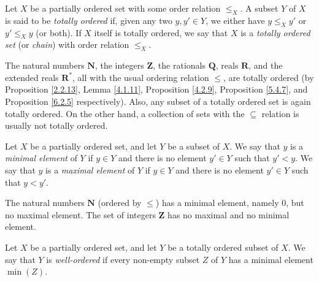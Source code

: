 \begin{definition}\label{8.5.3}
    Let \(X\) be a partially ordered set with some order relation \(\leq_X\).
    A subset \(Y\) of \(X\) is said to be \emph{totally ordered} if, given any two \(y, y' \in Y\), we either have \(y \leq_X y'\) or \(y' \leq_X y\) (or both).
    If \(X\) itself is totally ordered, we say that \(X\) is a \emph{totally ordered set} (or \emph{chain}) with order relation \(\leq_X\).
\end{definition}

\begin{example}\label{8.5.4}
    The natural numbers \(\mathbf{N}\), the integers \(\mathbf{Z}\), the rationals \(\mathbf{Q}\), reals \(\mathbf{R}\), and the extended reals \(\mathbf{R}^*\), all with the usual ordering relation \(\leq\), are totally ordered
    (by Proposition \ref{2.2.13}, Lemma \ref{4.1.11}, Proposition \ref{4.2.9}, Proposition \ref{5.4.7}, and Proposition \ref{6.2.5} respectively).
    Also, any subset of a totally ordered set is again totally ordered. On the other hand, a collection of sets with the \(\subseteq\) relation is usually not totally ordered.
\end{example}

\begin{definition}\label{8.5.5}
    Let \(X\) be a partially ordered set, and let \(Y\) be a subset of \(X\).
    We say that \(y\) is a \emph{minimal element} of \(Y\) if \(y \in Y\) and there is no element \(y' \in Y\) such that \(y' < y\).
    We say that \(y\) is a \emph{maximal element} of \(Y\) if \(y \in Y\) and there is no element \(y' \in Y\) such that \(y < y'\).
\end{definition}

\setcounter{theorem}{6}
\begin{example}\label{8.5.7}
    The natural numbers \(\mathbf{N}\) (ordered by \(\leq\)) has a minimal element, namely \(0\), but no maximal element.
    The set of integers \(\mathbf{Z}\) has no maximal and no minimal element.
\end{example}

\begin{definition}\label{8.5.8}
    Let \(X\) be a partially ordered set, and let \(Y\) be a totally ordered subset of \(X\).
    We say that \(Y\) is \emph{well-ordered} if every non-empty subset \(Z\) of \(Y\) has a minimal element \(\min(Z)\).
\end{definition}

